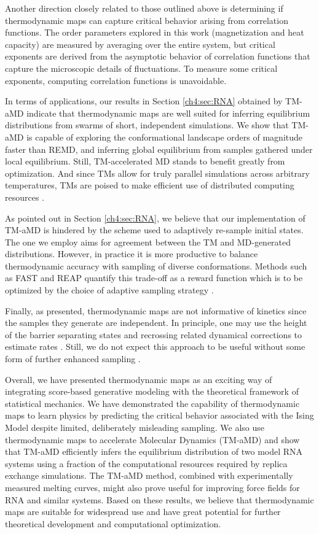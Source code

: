 Another direction closely related to those outlined above is determining if thermodynamic maps can capture critical behavior arising from correlation functions. The order parameters explored in this work (magnetization and heat capacity) are measured by averaging over the entire system, but critical exponents are derived from the asymptotic behavior of correlation functions that capture the microscopic details of fluctuations. To measure some critical exponents, computing correlation functions is unavoidable.

In terms of applications, our results in Section \ref{ch4:sec:RNA} obtained by TM-aMD indicate that thermodynamic maps are well suited for inferring equilibrium distributions from swarms of short, independent simulations. We show that TM-aMD is capable of exploring the conformational landscape orders of magnitude faster than REMD, and inferring global equilibrium from samples gathered under local equilibrium. Still, TM-accelerated MD stands to benefit greatly from optimization. And since TMs allow for truly parallel simulations across arbitrary temperatures, TMs are poised to make efficient use of distributed computing resources \cite{folding-at-home}. 

As pointed out in Section \ref{ch4:sec:RNA}, we believe that our implementation of TM-aMD is hindered by the scheme used to adaptively re-sample initial states. The one we employ aims for agreement between the TM and MD-generated distributions. However, in practice it is more productive to balance thermodynamic accuracy with sampling of diverse conformations. Methods such as FAST and REAP quantify this trade-off as a reward function which is to be optimized by the choice of adaptive sampling strategy \cite{FAST,REAP}.

Finally, as presented, thermodynamic maps are not informative of kinetics since the samples they generate are independent. In principle, one may use the height of the barrier separating states and recrossing related dynamical corrections to estimate rates \cite{berne1988classical}. Still, we do not expect this approach to be useful without some form of further enhanced sampling \cite{tiwary2013metadynamics}.

Overall, we have presented thermodynamic maps as an exciting way of integrating score-based generative modeling with the theoretical framework of statistical mechanics. We have demonstrated the capability of thermodynamic maps to learn physics by predicting the critical behavior associated with the Ising Model despite limited, deliberately misleading sampling. We also use thermodynamic maps to accelerate Molecular Dynamics (TM-aMD) and show that TM-aMD efficiently infers the equilibrium distribution of two model RNA systems using a fraction of the computational resources required by replica exchange simulations. The TM-aMD method, combined with experimentally measured melting curves, might also prove useful for improving force fields for RNA and similar systems. Based on these results, we believe that thermodynamic maps are suitable for widespread use and have great potential for further theoretical development and computational optimization.


